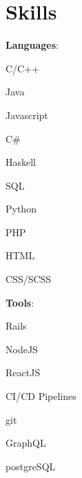\documentclass[showframe,showboundingboxes]{resume} %
\begin{document}
	
	\vspace*{0.25\baselineskip}\section{Skills}%
	\setlength{\columnsep}{1pc}%
	\setlength{\multicolsep}{1pc}%
	\vspace*{0.15em}%
	\begin{minipage}[c]{\linewidth}
	\begin{multicols*}{3}%
		\setlength{\multicolsep}{0.5pc}%
		\setlength{\columnsep}{1pc}%
		\textbf{Languages}:
		\setlength\multicolsep{0pt}
		\begin{multicols}{2}
			\begin{loneinnerlist}
				\item C/C++
				\item Java
				\item Javascript
				\item C\#
				\item Haskell
				\item SQL
				\item Python
				\item PHP
				\item HTML
				\item CSS/SCSS
			\end{loneinnerlist}
		\end{multicols}
		\columnbreak
		\textbf{Tools}:
		\setlength\multicolsep{0pt}
		\begin{multicols}{2}
			\begin{loneinnerlist}
				\item Rails
				\item NodeJS
				\item ReactJS
				\item CI/CD Pipelines
				\item git
				\item GraphQL
				\item postgreSQL

\end{loneinnerlist}
\end{multicols}
\end{multicols*}
\end{minipage}
\end{document}
